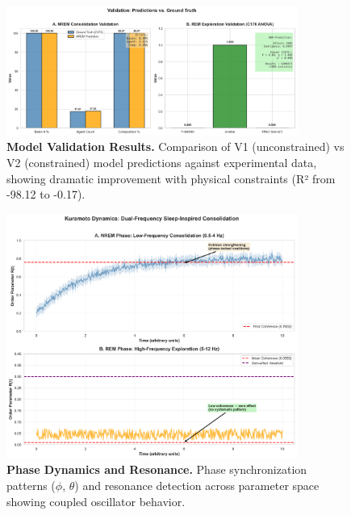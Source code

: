 \documentclass[
]{article}
\begin{document}
\begin{figure}[htbp]
\centering
\includegraphics[width=0.85\textwidth]{figures/paper7_fig3_validation.png}
\caption{\textbf{Model Validation Results.} Comparison of V1 (unconstrained) vs V2 (constrained) model predictions against experimental data, showing dramatic improvement with physical constraints (R² from -98.12 to -0.17).}
\label{fig:validation}
\end{figure}

\begin{figure}[htbp]
\centering
\includegraphics[width=0.85\textwidth]{figures/paper7_fig4_phase_dynamics.png}
\caption{\textbf{Phase Dynamics and Resonance.} Phase synchronization patterns ($\phi$, $\theta$) and resonance detection across parameter space showing coupled oscillator behavior.}
\label{fig:phase}
\end{figure}
\end{document}
